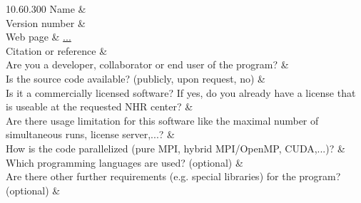 \documentclass[ext,showhints]{nhrproposal}
\begin{document}
\Titlepage

\ProgressReport
\ProgressReportSummary
{}
\SubprojectReportProgress
\SubprojectReportChallenges
\SubprojectReportProblems


\ProgressImprovements

\ProjectExtensionDescription
{}

\ComputeResourcesExtension
\CodeOverview
\begin{Codetable}{1}{0.6\linewidth}{0.3\linewidth}{0}{0} %
 Name           &  \\ \hline
 Version number &  \\ \hline
 Web page       & \url{...}   \\ \hline
 Citation or reference &   \\ \hline 
 Are you a developer, collaborator or end user of the program? &   \\ \hline
 Is the source code available? (publicly, upon request, no) &   \\ \hline
 Is it a commercially licensed software? If yes, do you already have a license that is useable at the requested NHR center?  &  \\ \hline
 Are there usage limitation for this software like the maximal number of simultaneous runs, license server,...?  &  \\ \hline
 How is the code parallelized (pure MPI, hybrid MPI/OpenMP, CUDA,...)? &  \\ \hline
 Which programming languages are used? (optional) &  \\ \hline
 Are there other further requirements (e.g. special libraries) for the program? (optional) &   \\ \hline
\end{Codetable}

\CodeBenchmarks
{}
\BenchmarkDescription
\end{document}
